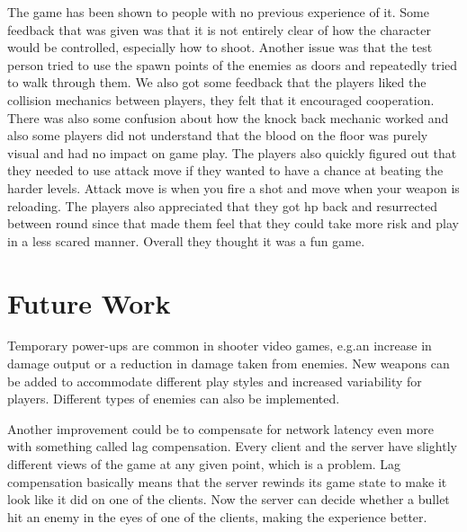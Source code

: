 \documentclass[a4paper]{article}
\begin{document}

The game has been shown to people with no previous experience of it. Some feedback that was given was that it is not entirely clear of how the character would be controlled, especially how to shoot. Another issue was that the test person tried to use the spawn points of the enemies as doors and repeatedly tried to walk through them. We also got some feedback that the players liked the collision mechanics between players, they felt that it encouraged cooperation. There was also some confusion about how the knock back mechanic worked and also some players did not understand that the blood on the floor was purely visual and had no impact on game play. The players also quickly figured out that they needed to use attack move if they wanted to have a chance at beating the harder levels. Attack move is when you fire a shot and move when your weapon is reloading. The players also appreciated that they got hp back and resurrected between round since that made them feel that they could take more risk and play in a less scared manner. Overall they thought it was a fun game.

\section{Future Work}
Temporary power-ups are common in shooter video games, e.g.\@ an increase in damage output or a reduction in damage taken from enemies. New weapons can be added to accommodate different play styles and increased variability for players. Different types of enemies can also be implemented.

Another improvement could be to compensate for network latency even more with something called lag compensation. Every client and the server have slightly different views of the game at any given point, which is a problem. Lag compensation basically means that the server rewinds its game state to make it look like it did on one of the clients. Now the server can decide whether a bullet hit an enemy in the eyes of one of the clients, making the experience better.
\end{document}

